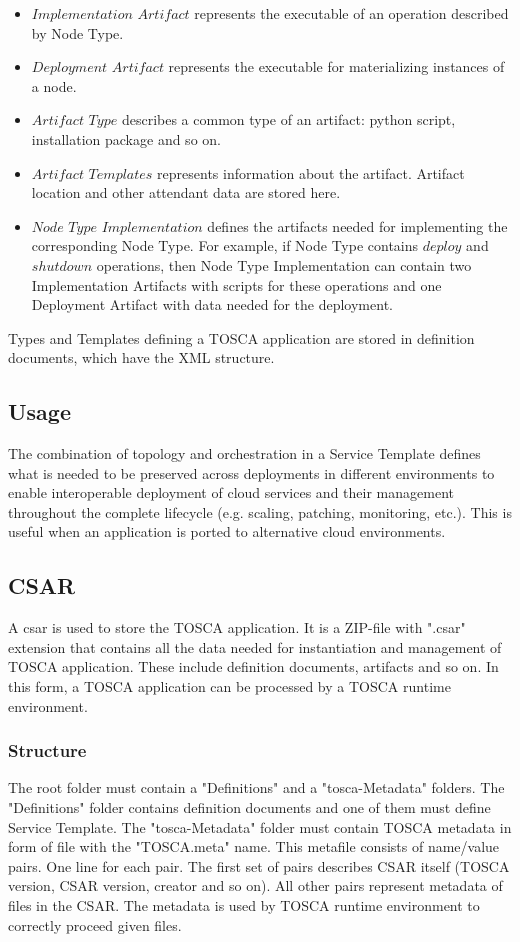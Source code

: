 \begin{itemize}
\item $Implementation$ $Artifact$ represents the executable of an operation described by Node Type.
\item $Deployment$ $Artifact$ represents the executable for materializing instances of a node.
\item $Artifact$ $Type$ describes a common type of an artifact: python script, installation package and so on.
\item $Artifact$ $Templates$ represents information about the artifact. 
	Artifact location and other attendant data are stored here.
\item $Node$ $Type$ $Implementation$ defines the artifacts needed for implementing the corresponding Node Type.
For example, if Node Type contains $deploy$ and $shutdown$ operations, then Node Type Implementation can contain two Implementation Artifacts with scripts for these operations and one Deployment Artifact with data needed for the deployment.
\end{itemize}
Types and Templates defining a TOSCA application are stored in definition documents, which have the XML structure.\\
\subsection*{Usage}
The combination of topology and orchestration in a Service Template defines what is needed to be preserved across deployments in different environments to enable interoperable deployment of cloud services and their management throughout the complete lifecycle (e.g. scaling, patching, monitoring, etc.).
This is useful when an application is ported to alternative cloud environments. \cite{TOSCA-v1.0_book} \\

\subsection{CSAR} \label{sec:csar}
A \gls{csar} is used to store the TOSCA application.
It is a ZIP-file with ".csar" extension that contains all the data needed for instantiation and management of TOSCA application.
These include definition documents, artifacts and so on.
In this form, a TOSCA application can be processed by a TOSCA runtime environment.
\subsubsection*{Structure}
The root folder must contain a "Definitions" and a "\gls{tosca}-Metadata" folders.
The "Definitions" folder contains definition documents and one of them must define Service Template.
The "\gls{tosca}-Metadata" folder must contain TOSCA metadata in form of file with the "TOSCA.meta" name.
This metafile consists of name/value pairs. 
One line for each pair. 
The first set of pairs describes CSAR itself (TOSCA version, CSAR version, creator and so on). 
All other pairs represent metadata of files in the CSAR. 
The metadata is used by TOSCA runtime environment to correctly proceed given files.

